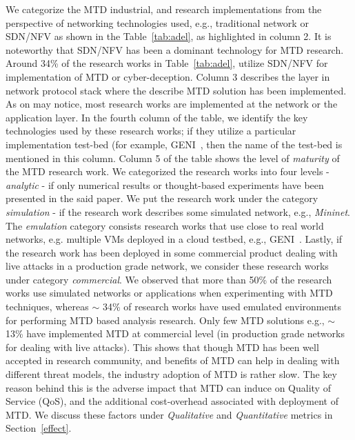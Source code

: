 We categorize the MTD industrial, and research implementations from the perspective of networking technologies used, e.g., traditional network or SDN/NFV as shown in the Table~\ref{tab:adel}, as highlighted in column 2. It is noteworthy that SDN/NFV has been a dominant technology for MTD research. Around 34\% of the research works in Table~\ref{tab:adel}, utilize SDN/NFV for implementation of MTD or cyber-deception. Column 3 describes the layer in network protocol stack where the describe MTD solution has been implemented. As on may notice, most research works are implemented at the network or the application layer. In the fourth column of the table, we identify the key technologies used by these research works; if they utilize a particular implementation test-bed (for example, GENI~, then the name of the test-bed is mentioned in this column. Column 5 of the table shows the level of \emph{maturity} of the MTD research work. We categorized the research works into four levels - \emph{analytic} - if only numerical results or thought-based experiments have been presented in the said paper. We put the research work under the category \emph{simulation} - if the research work describes some simulated network, e.g., \emph{Mininet}. The \emph{emulation} category consists research works that use close to real world networks, e.g. multiple VMs deployed in a cloud testbed, e.g., GENI~. Lastly, if the research work has been deployed in some commercial product dealing with live attacks in a production grade network, we consider these research works under category \emph{commercial}. 
We observed that more than 50\% of the research works use simulated networks or applications when experimenting with MTD techniques, whereas $\sim$ 34\% of research works have used emulated environments for performing MTD based analysis research. Only few MTD solutions e.g., $\sim$ 13\% have implemented MTD at commercial level (in production grade networks for dealing with live attacks). This shows that though MTD has been well accepted in research community, and benefits of MTD can help in dealing with different threat models, the industry adoption of MTD is rather slow. The key reason behind this is the adverse impact that MTD can induce on Quality of Service (QoS), and the additional cost-overhead associated with deployment of MTD. We discuss these factors under \emph{Qualitative} and \emph{Quantitative} metrics in Section~\ref{effect}.
